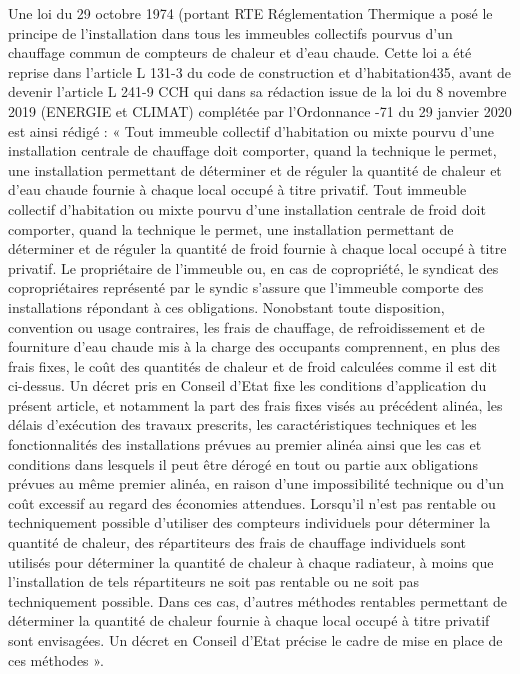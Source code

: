 		Une loi du 29 octobre 1974 (portant RTE Réglementation Thermique a posé le principe de l'installation dans tous les immeubles collectifs pourvus d'un chauffage commun de compteurs de chaleur et d'eau chaude. Cette loi a été reprise dans l'article L 131-3 du code de construction et d'habitation435, avant de devenir l’article L 241-9 CCH qui dans sa rédaction issue de la loi du 8 novembre 2019 (ENERGIE et CLIMAT) complétée par l’Ordonnance -71 du 29 janvier 2020 est ainsi rédigé :
		« Tout immeuble collectif d'habitation ou mixte pourvu d'une installation centrale de chauffage doit comporter, quand la technique le permet, une installation permettant de déterminer et de réguler la quantité de chaleur et d'eau chaude fournie à chaque local occupé à titre privatif. Tout immeuble collectif d'habitation ou mixte pourvu d'une installation centrale de froid doit comporter, quand la technique le permet, une installation permettant de déterminer et de réguler la quantité de froid fournie à chaque local occupé à titre privatif. Le propriétaire de l'immeuble ou, en cas de copropriété, le syndicat des copropriétaires représenté par le syndic s'assure que l'immeuble comporte des installations répondant à ces obligations. Nonobstant toute disposition, convention ou usage contraires, les frais de chauffage, de refroidissement et de fourniture d'eau chaude mis à la charge des occupants comprennent, en plus des frais fixes, le coût des quantités de chaleur et de froid calculées comme il est dit ci-dessus. Un décret pris en Conseil d'Etat fixe les conditions d'application du présent article, et notamment la part des frais fixes visés au précédent alinéa, les délais d'exécution des travaux prescrits, les caractéristiques techniques et les fonctionnalités des installations prévues au premier alinéa ainsi que les cas et conditions dans lesquels il peut être dérogé en tout ou partie aux obligations prévues au même premier alinéa, en raison d'une impossibilité technique ou d'un coût excessif au regard des économies attendues. Lorsqu'il n'est pas rentable ou techniquement possible d'utiliser des compteurs individuels pour déterminer la quantité de chaleur, des répartiteurs des frais de chauffage individuels sont utilisés pour déterminer la quantité de chaleur à chaque radiateur, à moins que l'installation de tels répartiteurs ne soit pas rentable ou ne soit pas techniquement possible. Dans ces cas, d'autres méthodes rentables permettant de déterminer la quantité de chaleur fournie à chaque local occupé à titre privatif sont envisagées. Un décret en Conseil d'Etat précise le cadre de mise en place de ces méthodes ».
